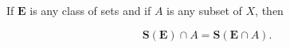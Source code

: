 If $\mathbf{E}$ is any class of sets and if $A$ is any subset of $X$, then

$$\mathbf{S}(\mathbf{E}) \cap A = \mathbf{S}(\mathbf{E} \cap A).$$
